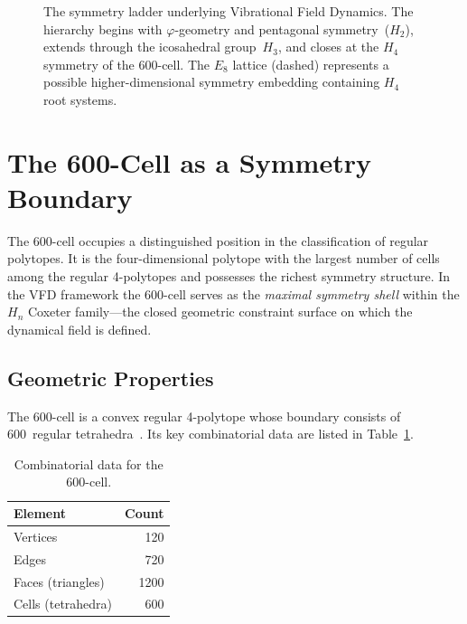 \documentclass[12pt,a4paper]{article}
\newcommand{\Hfour}{H_4}
\newcommand{\Hthree}{H_3}
\newcommand{\Htwo}{H_2}
\newcommand{\Eeight}{E_8}
\newcommand{\vphi}{\varphi}
\begin{document}
\begin{figure}[H]
\caption{The symmetry ladder underlying Vibrational Field Dynamics.  The
hierarchy begins with $\vphi$-geometry and pentagonal symmetry~($\Htwo$),
extends through the icosahedral group~$\Hthree$, and closes at the $\Hfour$
symmetry of the 600-cell.  The $\Eeight$ lattice (dashed) represents a
possible higher-dimensional symmetry embedding containing $\Hfour$ root
systems.}
\label{fig:ladder}
\end{figure}


\section{The 600-Cell as a Symmetry Boundary}\label{sec:600cell}

The 600-cell occupies a distinguished position in the classification of
regular polytopes.  It is the four-dimensional polytope with the largest
number of cells among the regular 4-polytopes and possesses the richest
symmetry structure.  In the VFD framework the 600-cell serves as the
\emph{maximal symmetry shell} within the $H_n$ Coxeter family---the closed
geometric constraint surface on which the dynamical field is defined.

\subsection{Geometric Properties}

The 600-cell is a convex regular 4-polytope whose boundary consists of
600~regular tetrahedra~\cite{coxeter1991}.  Its key combinatorial data are
listed in Table~\ref{tab:600cell}.

\begin{table}[H]
\centering
\caption{Combinatorial data for the 600-cell.}
\label{tab:600cell}
\begin{tabular}{@{}lr@{}}
\toprule
Element & Count \\
\midrule
Vertices & 120 \\
Edges & 720 \\
Faces (triangles) & 1200 \\
Cells (tetrahedra) & 600 \\
\bottomrule
\end{tabular}
\end{table}
\end{document}
